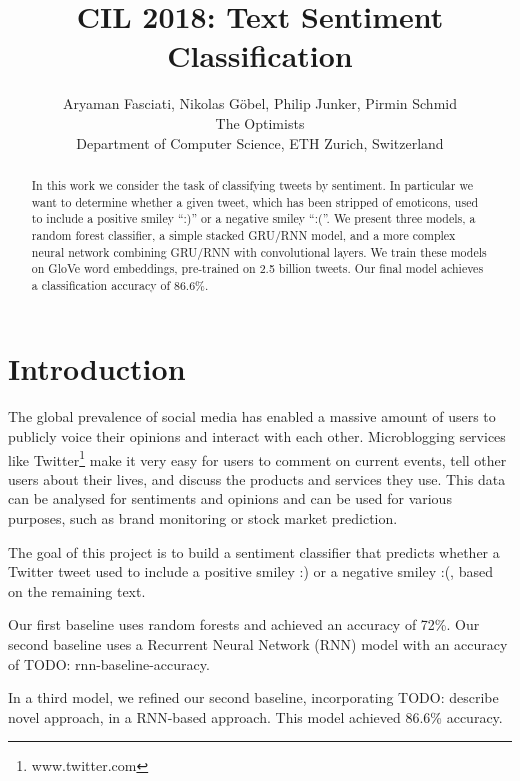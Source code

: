 \documentclass[10pt,conference,compsocconf]{IEEEtran}
\newcommand{\todo}[1]{}
\renewcommand{\todo}[1]{{\color{red} TODO: {#1}}}
\begin{document}
\title{CIL 2018: Text Sentiment Classification}

\author{
  Aryaman Fasciati, Nikolas G\"obel, Philip Junker, Pirmin Schmid\\
  The Optimists\\
  Department of Computer Science, ETH Zurich, Switzerland
}

\maketitle

\begin{abstract}
  In this work we consider the task of classifying tweets by
  sentiment. In particular we want to determine whether a given tweet,
  which has been stripped of emoticons, used to include a positive
  smiley ``:)'' or a negative smiley ``:(''. We present three models,
  a random forest classifier, a simple stacked GRU/RNN model, and a
  more complex neural network combining GRU/RNN with convolutional
  layers. We train these models on GloVe word embeddings, pre-trained
  on 2.5 billion tweets. Our final model achieves a classification accuracy
  of 86.6\%.
\end{abstract}

\section{Introduction}

The global prevalence of social media has enabled a massive amount of users
to publicly voice their opinions and interact with each other.
Microblogging services like Twitter\footnote{www.twitter.com} make it
very easy for users to comment on current events, tell other users about their
lives, and discuss the products and services they use.
This data can be analysed for sentiments and opinions and can be used for
various purposes, such as brand monitoring or stock market prediction.

The goal of this project is to build a sentiment classifier that
predicts whether a Twitter tweet used to include a positive smiley :) or
a negative smiley :(, based on the remaining text.

Our first baseline uses random forests and achieved an accuracy of
72\%. Our second baseline uses a Recurrent Neural Network (RNN) model
with an accuracy of \todo{rnn-baseline-accuracy}.

In a third model, we refined our second baseline, incorporating
\todo{describe novel approach}, in a RNN-based approach. This model
achieved 86.6\% accuracy.
\end{document}
